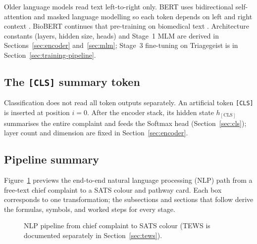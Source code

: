 Older language models read text left-to-right only. BERT uses bidirectional self-attention and masked language modelling so each token depends on left and right context \citep{devlin2019bert,vaswani2017attention}. BioBERT continues that pre-training on biomedical text \citep{lee2020biobert}. Architecture constants (layers, hidden size, heads) and Stage~1 MLM are derived in Sections~\ref{sec:encoder} and~\ref{sec:mlm}; Stage~3 fine-tuning on Triagegeist is in Section~\ref{sec:training-pipeline}.

\subsection{The \texttt{[CLS]} summary token}

Classification does not read all token outputs separately. An artificial token \texttt{[CLS]} is inserted at position \(i=0\). After the encoder stack, its hidden state \(h_{\mathrm{[CLS]}}\) summarises the entire complaint and feeds the Softmax head (Section~\ref{sec:cls}); layer count and dimension are fixed in Section~\ref{sec:encoder}.

\subsection{Pipeline summary}

Figure~\ref{fig:nlp-pipeline} previews the end-to-end natural language processing (NLP) path from a free-text chief complaint to a SATS colour and pathway card. Each box corresponds to one transformation; the subsections and sections that follow derive the formulas, symbols, and worked steps for every stage.

\begin{figure}[H]
\centering
{}
\caption{NLP pipeline from chief complaint to SATS colour (TEWS is documented separately in Section~\ref{sec:tews}).}
\label{fig:nlp-pipeline}
\end{figure}

